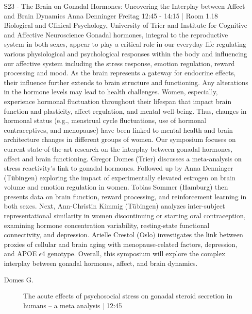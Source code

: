 
            \begin{symposium}
            {S23 - The Brain on Gonadal Hormones: Uncovering the Interplay between Affect and Brain Dynamics}
            {Anna Denninger}
            {Freitag 12:45 - 14:15 | Room 1.18}
            {Biological and Clinical Psychology, University of Trier and Institute for Cognitive and Affective Neuroscience}
            Gonadal hormones, integral to the reproductive system in both sexes, appear to play a critical role in our everyday life regulating various physiological and psychological responses within the body and influencing our affective system including the stress response, emotion regulation, reward processing and mood. As the brain represents a gateway for endocrine effects, their influence further extends to brain structure and functioning. Any alterations in the hormone levels may lead to health challenges. Women, especially, experience hormonal fluctuation throughout their lifespan that impact brain function and plasticity, affect regulation, and mental well-being. Thus, changes in hormonal status (e.g., menstrual cycle fluctuations, use of hormonal contraceptives, and menopause) have been linked to mental health and brain architecture changes in different groups of women. Our symposium focuses on current state-of-the-art research on the interplay between gonadal hormones, affect and brain functioning. Gregor Domes (Trier) discusses a meta-analysis on stress reactivity’s link to gonadal hormones. Followed up by Anna Denninger (Tübingen) exploring the impact of experimentally elevated estrogen on brain volume and emotion regulation in women. Tobias Sommer (Hamburg) then presents data on brain function, reward processing, and reinforcement learning in both sexes. Next, Ann-Christin Kimmig (Tübingen) analyzes inter-subject representational similarity in women discontinuing or starting oral contraception, examining hormone concentration variability, resting-state functional connectivity, and depression. Arielle Crestol (Oslo) investigates the link between proxies of cellular and brain aging with menopause-related factors, depression, and APOE $\epsilon$4 genotype. Overall, this symposium will explore the complex interplay between gonadal hormones, affect, and brain dynamics.
            \begin{description}    
            
                \item [ Domes G.] The acute effects of psychosocial stress on gonadal steroid secretion in humans – a meta analysis \textcolor{mygray}{ | 12:45}    
                

\end{description}
\end{symposium}

